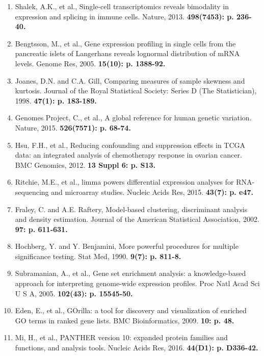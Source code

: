 \documentclass[11pt]{article}
\begin{document}
\begin{enumerate}
\item Shalek, A.K., et al., Single-cell transcriptomics reveals bimodality in expression and splicing in immune cells. Nature, 2013. \bf{498}(7453): p. 236-40.

\item Bengtsson, M., et al., Gene expression profiling in single cells from the pancreatic islets of Langerhans reveals lognormal distribution of mRNA levels. Genome Res, 2005. \bf{15}(10): p. 1388-92.

\item Joanes, D.N. and C.A. Gill, Comparing measures of sample skewness and kurtosis. Journal of the Royal Statistical Society: Series D (The Statistician), 1998. \bf{47}(1): p. 183-189.

\item Genomes Project, C., et al., A global reference for human genetic variation. Nature, 2015. \bf{526}(7571): p. 68-74.

\item Hsu, F.H., et al., Reducing confounding and suppression effects in TCGA data: an integrated analysis of chemotherapy response in ovarian cancer. BMC Genomics, 2012. \bf{13 Suppl 6}: p. S13.

\item Ritchie, M.E., et al., limma powers differential expression analyses for RNA-sequencing and microarray studies. Nucleic Acids Res, 2015. \bf{43}(7): p. e47.

\item Fraley, C. and A.E. Raftery, Model-based clustering, discriminant analysis and density estimation. Journal of the American Statistical Association, 2002. \bf{97}: p. 611-631.

\item Hochberg, Y. and Y. Benjamini, More powerful procedures for multiple significance testing. Stat Med, 1990. \bf{9}(7): p. 811-8.

\item Subramanian, A., et al., Gene set enrichment analysis: a knowledge-based approach for interpreting genome-wide expression profiles. Proc Natl Acad Sci U S A, 2005. \bf{102}(43): p. 15545-50.

\item Eden, E., et al., GOrilla: a tool for discovery and visualization of enriched GO terms in ranked gene lists. BMC Bioinformatics, 2009. \bf{10}: p. 48.

\item Mi, H., et al., PANTHER version 10: expanded protein families and functions, and analysis tools. Nucleic Acids Res, 2016. \bf{44}(D1): p. D336-42.


\end{enumerate}
\end{document}
